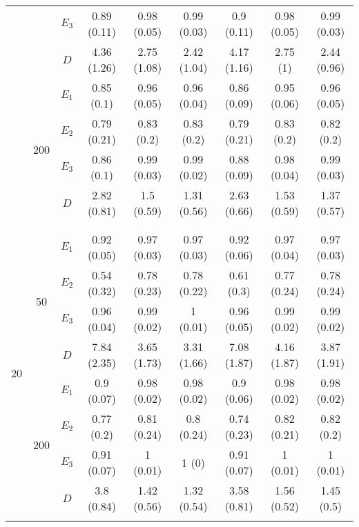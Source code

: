 \begin{table}[H]
\begin{tabular}{ccc|ccc|ccc}
  & & $E_3$ & 0.89 (0.11) & 0.98 (0.05) & 0.99 (0.03) & 0.9 (0.11) & 0.98 (0.05) & 0.99 (0.03) \\ 
  & & $D$ & 4.36 (1.26) & 2.75 (1.08) & 2.42 (1.04) & 4.17 (1.16) & 2.75 (1) & 2.44 (0.96) \\ 
  & \multirow{4}{*}{200} & $E_1$ & 0.85 (0.1) & 0.96 (0.05) & 0.96 (0.04) & 0.86 (0.09) & 0.95 (0.06) & 0.96 (0.05) \\ 
  & & $E_2$ & 0.79 (0.21) & 0.83 (0.2) & 0.83 (0.2) & 0.79 (0.21) & 0.83 (0.2) & 0.82 (0.2) \\ 
  & & $E_3$ & 0.86 (0.1) & 0.99 (0.03) & 0.99 (0.02) & 0.88 (0.09) & 0.98 (0.04) & 0.99 (0.03) \\ 
  & & $D$ & 2.82 (0.81) & 1.5 (0.59) & 1.31 (0.56) & 2.63 (0.66) & 1.53 (0.59) & 1.37 (0.57) \\
  \multicolumn{3}{c|}{} & \multicolumn{6}{c}{} \\  
  \hline
  \multicolumn{3}{c|}{} & \multicolumn{6}{c}{} \\ 
  \multirow{8}{*}{20} & \multirow{4}{*}{50} & $E_1$ & 0.92 (0.05) & 0.97 (0.03) & 0.97 (0.03) & 0.92 (0.06) & 0.97 (0.04) & 0.97 (0.03) \\ 
  & & $E_2$ & 0.54 (0.32) & 0.78 (0.23) & 0.78 (0.22) & 0.61 (0.3) & 0.77 (0.24) & 0.78 (0.24) \\ 
  & & $E_3$ & 0.96 (0.04) & 0.99 (0.02) & 1 (0.01) & 0.96 (0.05) & 0.99 (0.02) & 0.99 (0.02) \\ 
  & & $D$ & 7.84 (2.35) & 3.65 (1.73) & 3.31 (1.66) & 7.08 (1.87) & 4.16 (1.87) & 3.87 (1.91) \\ 
  & \multirow{4}{*}{200} & $E_1$ & 0.9 (0.07) & 0.98 (0.02) & 0.98 (0.02) & 0.9 (0.06) & 0.98 (0.02) & 0.98 (0.02) \\ 
  & & $E_2$ & 0.77 (0.2) & 0.81 (0.24) & 0.8 (0.24) & 0.74 (0.23) & 0.82 (0.21) & 0.82 (0.2) \\ 
  & & $E_3$ & 0.91 (0.07) & 1 (0.01) & 1 (0) & 0.91 (0.07) & 1 (0.01) & 1 (0.01) \\ 
  & & $D$ & 3.8 (0.84) & 1.42 (0.56) & 1.32 (0.54) & 3.58 (0.81) & 1.56 (0.52) & 1.45 (0.5) \\ 
  \multicolumn{3}{c|}{} & \multicolumn{6}{c}{} \\ 
   \hline
\end{tabular}
\label{tab:errorcomp}
\end{table}



